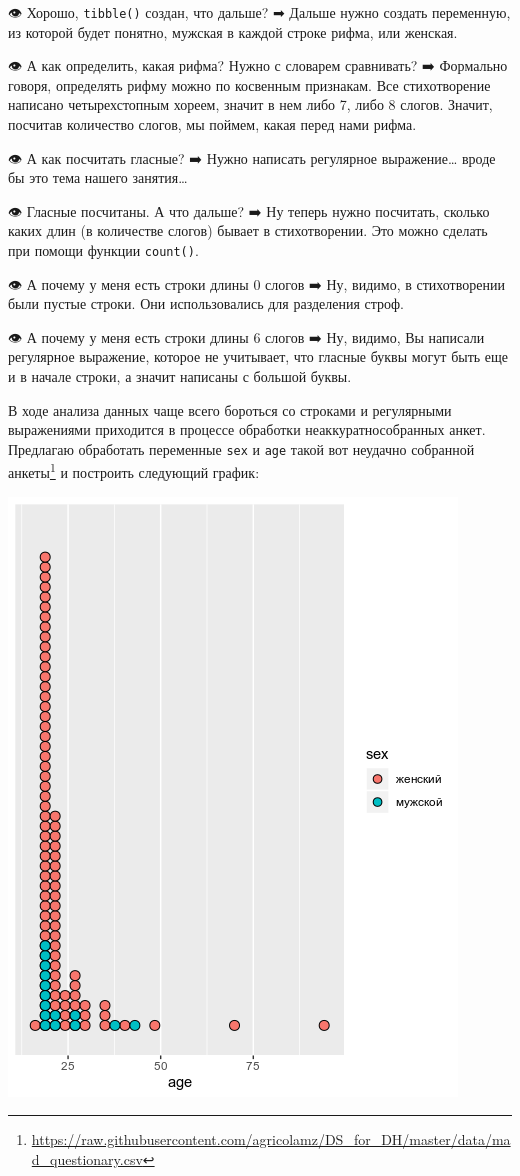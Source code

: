 \documentclass[
]{book}
\makeatletter
\renewcommand{\href}[2]{#2\footnote{\url{#1}}}
\newenvironment{kframe}{%
    \medskip{}
    \setlength{\fboxsep}{.8em}
    \def\at@end@of@kframe{}%
    \ifinner\ifhmode%
    \def\at@end@of@kframe{\end{minipage}}%
    \begin{minipage}{\columnwidth}%
    \fi\fi%
    \def\FrameCommand##1{\hskip\@totalleftmargin \hskip-\fboxsep
    \colorbox{shadecolor}{##1}\hskip-\fboxsep
        \hskip-\linewidth \hskip-\@totalleftmargin \hskip\columnwidth}%
    \MakeFramed {\advance\hsize-\width
      \@totalleftmargin\z@ \linewidth\hsize
      \@setminipage}}%
  {\par\unskip\endMakeFramed%
    \at@end@of@kframe}
\newenvironment{rmdblock}[1]
  {
    \begin{itemize}
    \renewcommand{\labelitemi}{
      \raisebox{-.7\height}[0pt][0pt]{
        {\setkeys{Gin}{width=3em,keepaspectratio}\texttt{[image: images/\#1]}}
        }
        }
        \setlength{\fboxsep}{1em}
        \begin{kframe}
        \item
      }
      {
        \end{kframe}
        \end{itemize}
      }
\newenvironment{rmdtask}
      {\begin{rmdblock}{task}}
      {\end{rmdblock}}
\makeatother
\begin{document}
👁 Хорошо, \texttt{tibble()} создан, что дальше? ➡
Дальше нужно создать переменную, из которой будет понятно, мужская в каждой строке рифма, или женская.

👁 А как определить, какая рифма? Нужно с словарем сравнивать? ➡
Формально говоря, определять рифму можно по косвенным признакам. Все стихотворение написано четырехстопным хореем, значит в нем либо 7, либо 8 слогов. Значит, посчитав количество слогов, мы поймем, какая перед нами рифма.

👁 А как посчитать гласные? ➡
Нужно написать регулярное выражение\ldots{} вроде бы это тема нашего занятия\ldots{}

👁 Гласные посчитаны. А что дальше? ➡
Ну теперь нужно посчитать, сколько каких длин (в количестве слогов) бывает в стихотворении. Это можно сделать при помощи функции \texttt{count()}.

👁 А почему у меня есть строки длины 0 слогов ➡
Ну, видимо, в стихотворении были пустые строки. Они использовались для разделения строф.

👁 А почему у меня есть строки длины 6 слогов ➡
Ну, видимо, Вы написали регулярное выражение, которое не учитывает, что гласные буквы могут быть еще и в начале строки, а значит написаны с большой буквы.

\begin{rmdtask}
В ходе анализа данных чаще всего бороться со строками и регулярными
выражениями приходится в процессе обработки неаккуратнособранных анкет.
Предлагаю обработать переменные \texttt{sex} и \texttt{age}
\href{https://raw.githubusercontent.com/agricolamz/DS_for_DH/master/data/mad_questionary.csv}{такой
вот неудачно собранной анкеты} и построить следующий график:
\end{rmdtask}

\includegraphics{images/mad_questionary_task.png}
\end{document}
